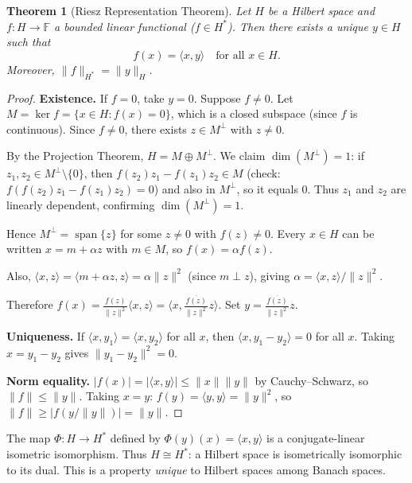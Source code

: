 \documentclass[11pt,a4paper]{article}
\theoremstyle{definition}
\theoremstyle{plain}
\newtheorem{theorem}{Theorem}[section]
\theoremstyle{remark}
\DeclareMathOperator{\spn}{span}
\begin{document}
\begin{theorem}[Riesz Representation Theorem]\label{thm:riesz}
Let $H$ be a Hilbert space and $f \colon H \to \mathbb{F}$ a bounded linear
functional ($f \in H^*$). Then there exists a unique $y \in H$ such that
\[
    f(x) = \langle x, y \rangle \quad \text{for all } x \in H.
\]
Moreover, $\|f\|_{H^*} = \|y\|_H$.
\end{theorem}

\begin{proof}
\textbf{Existence.} If $f = 0$, take $y = 0$.
Suppose $f \neq 0$. Let $M = \ker f = \{x \in H : f(x) = 0\}$, which is
a closed subspace (since $f$ is continuous). Since $f \neq 0$, there exists
$z \in M^\perp$ with $z \neq 0$.

By the Projection Theorem, $H = M \oplus M^\perp$. We claim
$\dim(M^\perp) = 1$: if $z_1, z_2 \in M^\perp \setminus \{0\}$, then
$f(z_2) z_1 - f(z_1) z_2 \in M$ (check: $f(f(z_2)z_1 - f(z_1)z_2) = 0$)
and also in $M^\perp$, so it equals 0. Thus $z_1$ and $z_2$ are linearly
dependent, confirming $\dim(M^\perp) = 1$.

Hence $M^\perp = \spn\{z\}$ for some $z \neq 0$ with $f(z) \neq 0$.
Every $x \in H$ can be written $x = m + \alpha z$ with $m \in M$, so
$f(x) = \alpha f(z)$.

Also, $\langle x, z \rangle = \langle m + \alpha z, z \rangle
= \alpha \|z\|^2$ (since $m \perp z$), giving $\alpha = \langle x, z \rangle / \|z\|^2$.

Therefore
$f(x) = \frac{f(z)}{\|z\|^2} \langle x, z \rangle
= \langle x, \frac{\overline{f(z)}}{\|z\|^2} z \rangle$.
Set $y = \frac{\overline{f(z)}}{\|z\|^2} z$.

\textbf{Uniqueness.} If $\langle x, y_1 \rangle = \langle x, y_2 \rangle$
for all $x$, then $\langle x, y_1 - y_2 \rangle = 0$ for all $x$.
Taking $x = y_1 - y_2$ gives $\|y_1 - y_2\|^2 = 0$.

\textbf{Norm equality.}
$|f(x)| = |\langle x, y \rangle| \leq \|x\| \|y\|$ by Cauchy--Schwarz,
so $\|f\| \leq \|y\|$. Taking $x = y$:
$f(y) = \langle y, y \rangle = \|y\|^2$, so $\|f\| \geq |f(y/\|y\|)| = \|y\|$.
\end{proof}

\begin{keyresult}
The map $\Phi \colon H \to H^*$ defined by $\Phi(y)(x) = \langle x, y \rangle$
is a conjugate-linear isometric isomorphism. Thus $H \cong H^*$: a Hilbert
space is isometrically isomorphic to its dual. This is a property
\emph{unique} to Hilbert spaces among Banach spaces.
\end{keyresult}
\end{document}

